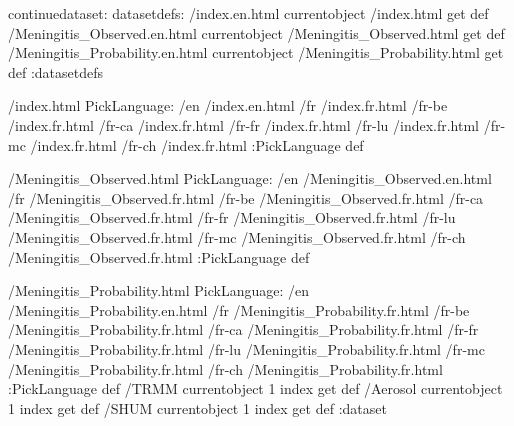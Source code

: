 \begin{ingrid}
continuedataset:
datasetdefs:
/index.en.html currentobject /index.html get def
/Meningitis_Observed.en.html currentobject /Meningitis_Observed.html get def
/Meningitis_Probability.en.html currentobject /Meningitis_Probability.html get def
:datasetdefs

/index.html {
PickLanguage:
/en /index.en.html
/fr /index.fr.html
/fr-be /index.fr.html
/fr-ca /index.fr.html
/fr-fr /index.fr.html
/fr-lu /index.fr.html
/fr-mc /index.fr.html
/fr-ch /index.fr.html
:PickLanguage
} def

/Meningitis_Observed.html {
PickLanguage:
/en /Meningitis_Observed.en.html
/fr /Meningitis_Observed.fr.html
/fr-be /Meningitis_Observed.fr.html
/fr-ca /Meningitis_Observed.fr.html
/fr-fr /Meningitis_Observed.fr.html
/fr-lu /Meningitis_Observed.fr.html
/fr-mc /Meningitis_Observed.fr.html
/fr-ch /Meningitis_Observed.fr.html
:PickLanguage
} def

/Meningitis_Probability.html {
PickLanguage:
/en /Meningitis_Probability.en.html
/fr /Meningitis_Probability.fr.html
/fr-be /Meningitis_Probability.fr.html
/fr-ca /Meningitis_Probability.fr.html
/fr-fr /Meningitis_Probability.fr.html
/fr-lu /Meningitis_Probability.fr.html
/fr-mc /Meningitis_Probability.fr.html
/fr-ch /Meningitis_Probability.fr.html
:PickLanguage
} def
/TRMM currentobject 1 index get def
/Aerosol currentobject 1 index get def
/SHUM currentobject 1 index get def
:dataset
\end{ingrid}
